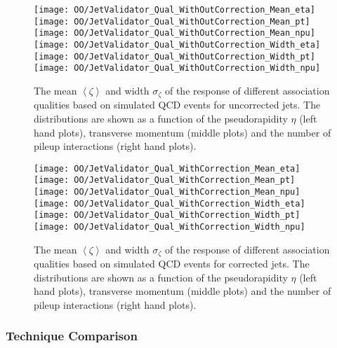 \begin{figure}[h!t]
  \centering
  \texttt{[image: OO/JetValidator\_Qual\_WithOutCorrection\_Mean\_eta]}
  \texttt{[image: OO/JetValidator\_Qual\_WithOutCorrection\_Mean\_pt]}
  \texttt{[image: OO/JetValidator\_Qual\_WithOutCorrection\_Mean\_npu]}
  \\
  \texttt{[image: OO/JetValidator\_Qual\_WithOutCorrection\_Width\_eta]}
  \texttt{[image: OO/JetValidator\_Qual\_WithOutCorrection\_Width\_pt]}
  \texttt{[image: OO/JetValidator\_Qual\_WithOutCorrection\_Width\_npu]}
  \caption[Mean and width of the \pt{} response for different qualities based on simulated QCD events for uncorrected jets]{The mean $\left<\zeta\right>$ and width $\sigma_{\zeta}$ of the \pt{} response of different association qualities based on simulated QCD events for uncorrected jets. The distributions are shown as a function of the pseudorapidity $\eta$ (left hand plots), transverse momentum (middle plots) and the number of pileup interactions (right hand plots). \label{plot:OOJetsPtResponseQualWO}}
\end{figure}

\begin{figure}[h!t]
  \centering
  \texttt{[image: OO/JetValidator\_Qual\_WithCorrection\_Mean\_eta]}
  \texttt{[image: OO/JetValidator\_Qual\_WithCorrection\_Mean\_pt]}
  \texttt{[image: OO/JetValidator\_Qual\_WithCorrection\_Mean\_npu]}
  \\
  \texttt{[image: OO/JetValidator\_Qual\_WithCorrection\_Width\_eta]}
  \texttt{[image: OO/JetValidator\_Qual\_WithCorrection\_Width\_pt]}
  \texttt{[image: OO/JetValidator\_Qual\_WithCorrection\_Width\_npu]}
  \caption[Mean and width of the \pt{} response for different qualities based on simulated QCD events for corrected jets]{The mean $\left<\zeta\right>$ and width $\sigma_{\zeta}$ of the \pt{} response of different association qualities based on simulated QCD events for corrected jets. The distributions are shown as a function of the pseudorapidity $\eta$ (left hand plots), transverse momentum (middle plots) and the number of pileup interactions (right hand plots). \label{plot:OOJetsPtResponseQualW}}
\end{figure}



\subsubsection{Technique Comparison \label{sec:OOJetsPtResponseComp} }

